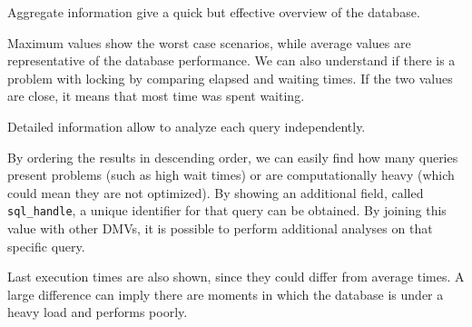             Aggregate information give a quick but effective overview of the database.
            
            Maximum values show the worst case scenarios, while average values are representative of the database performance.
            We can also understand if there is a problem with locking by comparing elapsed and waiting times.
            If the two values are close, it means that most time was spent waiting.
        
            Detailed information allow to analyze each query independently.
            
            By ordering the results in descending order, we can easily find how many queries present problems (such as high wait times) or are computationally heavy (which could mean they are not optimized).
            By showing an additional field, called \texttt{sql\_handle}, a unique identifier for that query can be obtained.
            By joining this value with other DMVs, it is possible to perform additional analyses on that specific query.
            
            Last execution times are also shown, since they could differ from average times.
            A large difference can imply there are moments in which the database is under a heavy load and performs poorly.